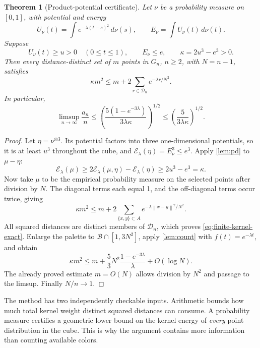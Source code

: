 \documentclass[11pt,letterpaper]{article}
\newtheorem{theorem}{Theorem}[section]
\theoremstyle{definition}
\newcommand{\norm}[1]{\left\lVert #1\right\rVert}
\newcommand{\calE}{\mathcal E}
\newcommand{\calB}{\mathcal B}
\newcommand{\calD}{\mathcal D}
\begin{document}
\begin{theorem}[Product-potential certificate]
\label{thm:kernel}
Let \(\nu\) be a probability measure on \([0,1]\), with potential and
energy
\[
 U_\nu(t)=\int e^{-\lambda(t-s)^2}\,d\nu(s),\qquad
 E_\nu=\int U_\nu(t)\,d\nu(t).
\]
Suppose
\[
 U_\nu(t)\ge u>0\quad(0\le t\le1),\qquad E_\nu\le e,
 \qquad \kappa=2u^3-e^3>0.
\]
Then every distance-distinct set of \(m\) points in \(G_n\), \(n\ge2\),
with \(N=n-1\), satisfies
\begin{equation}
 \kappa m^2\le m+2\sum_{r\in\calD_n}e^{-\lambda r/N^2}.
 \label{eq:finite-kernel-exact}
\end{equation}
In particular,
\begin{equation}
 \limsup_{n\to\infty}\frac{a_n}{n}
 \le
 \left(\frac{5(1-e^{-3\lambda})}{3\lambda\kappa}\right)^{1/2}
 \le\left(\frac5{3\lambda\kappa}\right)^{1/2}.
 \label{eq:kernel-asymptotic}
\end{equation}
\end{theorem}
\begin{proof}
Let \(\eta=\nu^{\otimes3}\). Its potential factors into three
one-dimensional potentials, so it is at least \(u^3\) throughout the
cube, and \(\calE_\lambda(\eta)=E_\nu^3\le e^3\).
Apply \cref{lem:pd} to \(\mu-\eta\):
\[
 \calE_\lambda(\mu)
 \ge2\calE_\lambda(\mu,\eta)-\calE_\lambda(\eta)
 \ge2u^3-e^3=\kappa.
\]
Now take \(\mu\) to be the empirical probability measure on the
selected points after division by \(N\). The diagonal terms each equal
1, and the off-diagonal terms occur twice, giving
\[
 \kappa m^2
 \le m+2\sum_{\{x,y\}\subset A}e^{-\lambda\norm{x-y}^2/N^2}.
\]
All squared distances are distinct members of \(\calD_n\), which proves
\cref{eq:finite-kernel-exact}. Enlarge the palette to
\(\calB\cap[1,3N^2]\), apply \cref{lem:count} with
\(f(t)=e^{-\lambda t}\), and obtain
\[
 \kappa m^2\le m+
 \frac53N^2\frac{1-e^{-3\lambda}}{\lambda}+O(\log N).
\]
The already proved estimate \(m=O(N)\) allows division by \(N^2\) and
passage to the limsup. Finally \(N/n\to1\).
\end{proof}

The method has two independently checkable inputs. Arithmetic bounds
how much total kernel weight distinct squared distances can consume.
A probability measure certifies a geometric lower bound on the kernel
energy of \emph{every} point distribution in the cube. This is why the
argument contains more information than counting available colors.
\end{document}
